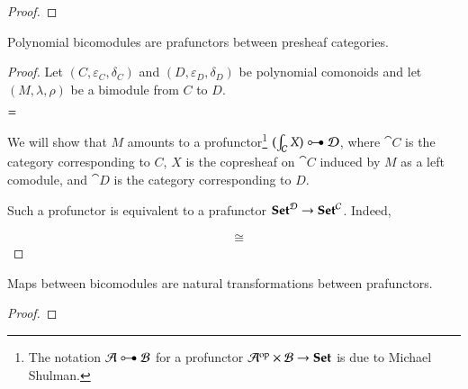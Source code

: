 \documentclass{amsart}
\begin{document}
\begin{proof}
  \iffalse

    We verify $X$ satisfies the laws of a copresheaf on $\cat{C}$.
    \begin{itemize}
    \item The identity law $m(x, e(t(x))) = x$ is implied by the left
      comodule identity law, which
    \item The associativity law $m(m(z, f), g) = m(z, m(f, g))$ is
      implied by the left comodule associativity law, which
    \item The law $t(m(x, f)) = t(f)$ is forced to hold by the
      associativity law, as seen earlier.
    \end{itemize}

  The law $s(m(f|_w, z)) = s(f|_w)$ is forced to hold by the
    associativity law, in the same way as was seen earlier, keeping in
    mind that here the laws $t(e(x)) = x$ and
    $t(m(f|_w, g|_{m(w,f)})) = t(g|_{m(w,f)})$ are satisfied.
  \fi
  
\end{proof}

\begin{prop}
  Polynomial bicomodules are prafunctors between presheaf categories.
\end{prop}
\begin{proof}
  Let $(C, \varepsilon_C, \delta_C)$ and
  $(D, \varepsilon_D, \delta_D)$ be polynomial comonoids and let
  $(M, \lambda, \rho)$ be a bimodule from $C$ to $D$.
  \begin{center}
    
    \quad
    $=$
    \quad
    
  \end{center}

  We will show that $M$ amounts to a profunctor\footnote{The notation
    $\cat{A} \prof \cat{B}$ for a profunctor
    $\mathcal{A}^{\mathrm{op}} \times \mathcal{B} \to {\normalfont\mathbf{Set}}$ is due to Michael Shulman.}
  $(\int_{\cat{C}} X) \prof \cat{D}$, where $\cat{C}$ is the category
  corresponding to $C$, $X$ is the copresheaf on $\cat{C}$ induced by
  $M$ as a left comodule, and $\cat{D}$ is the category corresponding
  to $D$.

  Such a profunctor is equivalent to a prafunctor
  ${\normalfont\mathbf{Set}}^{\mathcal{D}} \to {\normalfont\mathbf{Set}}^{\mathcal{C}}$. Indeed,

  \begin{align*}
    &\cong
  \end{align*}
  
\end{proof}

\begin{prop}
  Maps between bicomodules are natural transformations between prafunctors.
\end{prop}
\begin{proof}
  
\end{proof}
\end{document}
